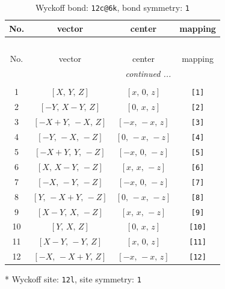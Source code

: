 \documentclass[fleqn,8pt]{jsarticle}
\begin{document}
\begin{longtable}{cccc}
\caption{Wyckoff bond: {\tt 12c@6k}, bond symmetry: {\tt 1}}
 \\
 \hline \hline
No. & vector & center & mapping \\ \hline \endfirsthead

\multicolumn{3}{l}{\tablename\ \thetable{}} \\
 \hline \hline
No. & vector & center & mapping \\ \hline \endhead

 \hline \hline
\multicolumn{3}{r}{\footnotesize\it continued ...} \\ \endfoot

 \hline \hline
\multicolumn{3}{r}{} \\ \endlastfoot

1 & $\left[ X,\, Y,\, Z \right]$ & $\left[ x,\, 0,\, z \right]$ & {\tt [1]} \\ \hline
2 & $\left[ - Y,\, X - Y,\, Z \right]$ & $\left[ 0,\, x,\, z \right]$ & {\tt [2]} \\ \hline
3 & $\left[ - X + Y,\, - X,\, Z \right]$ & $\left[ - x,\, - x,\, z \right]$ & {\tt [3]} \\ \hline
4 & $\left[ - Y,\, - X,\, - Z \right]$ & $\left[ 0,\, - x,\, - z \right]$ & {\tt [4]} \\ \hline
5 & $\left[ - X + Y,\, Y,\, - Z \right]$ & $\left[ - x,\, 0,\, - z \right]$ & {\tt [5]} \\ \hline
6 & $\left[ X,\, X - Y,\, - Z \right]$ & $\left[ x,\, x,\, - z \right]$ & {\tt [6]} \\ \hline
7 & $\left[ - X,\, - Y,\, - Z \right]$ & $\left[ - x,\, 0,\, - z \right]$ & {\tt [7]} \\ \hline
8 & $\left[ Y,\, - X + Y,\, - Z \right]$ & $\left[ 0,\, - x,\, - z \right]$ & {\tt [8]} \\ \hline
9 & $\left[ X - Y,\, X,\, - Z \right]$ & $\left[ x,\, x,\, - z \right]$ & {\tt [9]} \\ \hline
10 & $\left[ Y,\, X,\, Z \right]$ & $\left[ 0,\, x,\, z \right]$ & {\tt [10]} \\ \hline
11 & $\left[ X - Y,\, - Y,\, Z \right]$ & $\left[ x,\, 0,\, z \right]$ & {\tt [11]} \\ \hline
12 & $\left[ - X,\, - X + Y,\, Z \right]$ & $\left[ - x,\, - x,\, z \right]$ & {\tt [12]} \\
\end{longtable}
* Wyckoff site: {\tt 12l}, site symmetry: {\tt 1}
\renewcommand{\arraystretch}{1.2}
\end{document}
